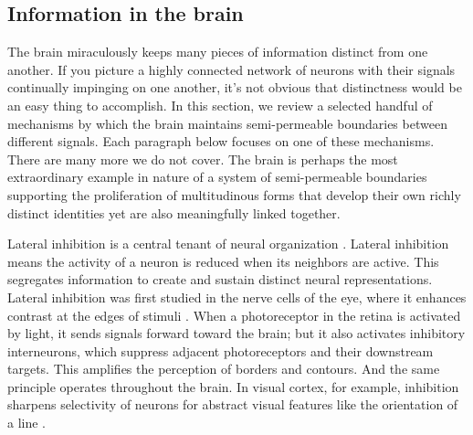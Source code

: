 \documentclass[11pt]{article}
\begin{document}



\subsection{Information in the brain}



The brain miraculously keeps many pieces of information distinct from one another. If you picture a highly connected network of neurons with their signals continually impinging on one another, it's not obvious that distinctness would be an easy thing to accomplish. In this section, we review a selected handful of mechanisms by which the brain maintains semi-permeable boundaries between different signals. Each paragraph below focuses on one of these mechanisms. There are many more we do not cover. The brain is perhaps the most extraordinary example in nature of a system of semi-permeable boundaries supporting the proliferation of multitudinous forms that develop their own richly distinct identities yet are also meaningfully linked together.

Lateral inhibition is a central tenant of neural organization \citep{isaacson2011inhibition, hubel1962receptive, douglas2004neuronal}. Lateral inhibition means the activity of a neuron is reduced when its neighbors are active. This segregates information to create and sustain distinct neural representations. Lateral inhibition was first studied in the nerve cells of the eye, where it enhances contrast at the edges of stimuli \citep{hartline1956inhibition}. When a photoreceptor in the retina is activated by light, it sends signals forward toward the brain; but it also activates inhibitory interneurons, which suppress adjacent photoreceptors and their downstream targets. This amplifies the perception of borders and contours. And the same principle operates throughout the brain. In visual cortex, for example, inhibition sharpens selectivity of neurons for abstract visual features like the orientation of a line \citep{sillito1975contribution}. 
\end{document}
